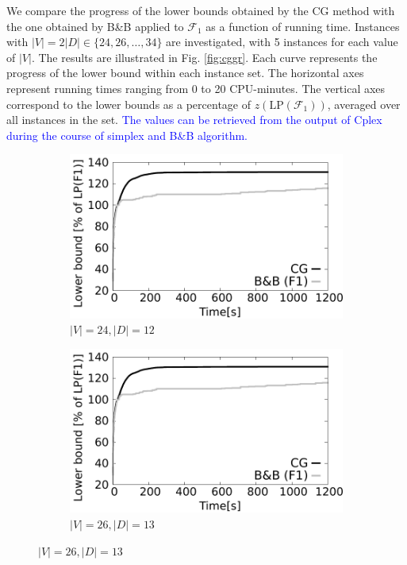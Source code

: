 We compare the progress of the lower bounds obtained by the CG method with the one obtained by B\&B applied to $\mathcal{F}_1$ as a function of running time.
Instances with $|V|=2|D|\in\{24, 26,\ldots, 34\}$ are investigated, with 5 instances for each value of $|V|$.
The results are illustrated in Fig. \ref{fig:cggr}.
Each curve represents the progress of the lower bound within each instance set.
The horizontal axes represent running times ranging from 0 to 20 CPU-minutes.
The vertical axes correspond to the lower bounds as a percentage of $z\left(\text{LP}(\mathcal{F}_1)\right)$, averaged over all instances in the set.
\textcolor{blue}{The values can be retrieved from the output of Cplex during the course of simplex and B\&B algorithm.}

\begin{figure}[!htb]
    \centering
    \begin{subfigure}[b]{0.49\textwidth}
        \includegraphics[width=\textwidth]{lower-bound-24-12}
        \caption{$|V|=24, |D|=12$}
        \label{fig:cggr24-12}
    \end{subfigure}
    \hfill %
    \begin{subfigure}[b]{0.49\textwidth}
        \includegraphics[width=\textwidth]{lower-bound-26-13}
        \caption{$|V|=26, |D|=13$}
        \label{fig:cggr26-13}
    \end{subfigure}
  

\end{figure}
